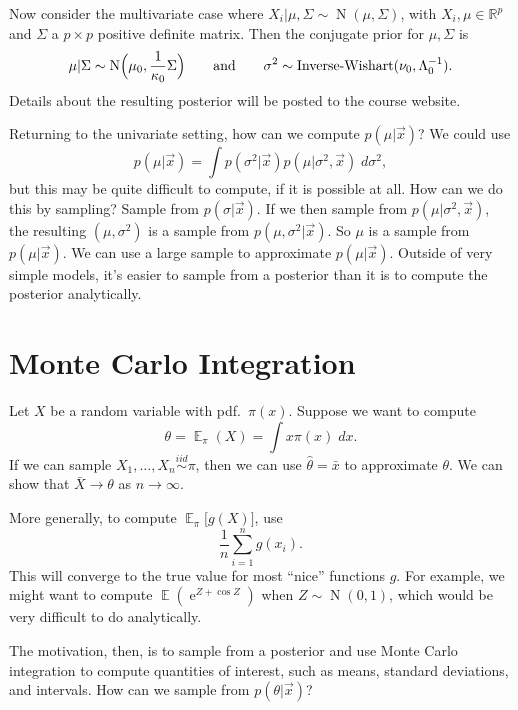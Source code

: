 \documentclass[article]{memoir}
\DeclareMathOperator{\E}{\mathbb{E}}
\DeclareMathOperator{\eul}{e}
\DeclareMathOperator{\1}{\mathbf{1}}
\newcommand{\dist}[1]{\operatorname{#1}}
\newcommand{\iid}{\overset{iid}{\sim}}
\theoremstyle{definition}
\begin{document}
Now consider the multivariate case where 
$X_i \vert \mu, \Sigma \sim \dist{N}(\mu, \Sigma)$, with 
$X_i, \mu \in \mathbb{R}^p$ and $\Sigma$ a $p \times p$ positive definite
matrix. Then the conjugate prior for $\mu, \Sigma$ is
    \[
    \mu \vert \Sigma
    \sim
    \dist{N}\Bigl( \mu_0, \frac{1}{\kappa_0} \Sigma \Bigr)
    \qquad\text{and}\qquad
    \sigma^2
    \sim
    \dist{Inverse-Wishart}(\nu_0, \Lambda_0^{-1}).
    \]
Details about the resulting posterior will be posted to the course website.

Returning to the univariate setting, how can we compute 
$p(\mu \vert \vec{x})$? We could use
    \[
    p(\mu \vert \vec{x})
    =
    \int p(\sigma^2 \vert \vec{x}) 
    p(\mu \vert \sigma^2, \vec{x}) \;d\sigma^2,
    \]
but this may be quite difficult to compute, if it is possible at all. How
can we do this by sampling? Sample from $p(\sigma \vert \vec{x})$. If we then
sample from $p(\mu \vert \sigma^2, \vec{x})$, the resulting $(\mu, \sigma^2)$
is a sample from $p(\mu, \sigma^2 \vert \vec{x})$. So $\mu$ is a sample from
$p(\mu \vert \vec{x})$. We can use a large sample to approximate
$p(\mu \vert \vec{x})$. Outside of very simple models, it's easier to sample
from a posterior than it is to compute the posterior analytically.

\chapter{Monte Carlo Integration}
Let $X$ be a random variable with pdf.\ $\pi(x)$. Suppose we want to compute
    \[
    \theta
    =
    \E_\pi(X)
    =
    \int x\pi(x) \;dx.
    \]
If we can sample $X_1, \ldots, X_n \iid \pi$, then we can use
$\hat{\theta} = \bar{x}$ to approximate $\theta$. We can show that
$\bar{X} \to \theta$ as $n \to \infty$.

More generally, to compute $\E_\pi \bigl[ g(X) \bigr]$, use
    \[
    \frac{1}{n} \sum_{i=1}^n g(x_i).
    \]
This will converge to the true value for most ``nice'' functions $g$.
For example, we might want to compute $\E(\eul^{Z + \cos Z})$ when
$Z \sim \dist{N}(0, 1)$, which would be very difficult to do analytically.

The motivation, then, is to sample from a posterior and use Monte Carlo
integration to compute quantities of interest, such as means, standard
deviations, and intervals. How can we sample from $p(\theta \vert \vec{x})$?
\end{document}
